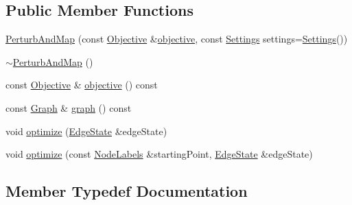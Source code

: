 \subsection*{Public Member Functions}
\begin{DoxyCompactItemize}
\item 
\hyperlink{classnifty_1_1graph_1_1PerturbAndMap_ac9393c6144f1a6a6dd9583fdc3532126}{Perturb\+And\+Map} (const \hyperlink{classnifty_1_1graph_1_1PerturbAndMap_a472da1848b099c685994a2cc915b02ed}{Objective} \&\hyperlink{classnifty_1_1graph_1_1PerturbAndMap_aef91817fc21b3551316dc9ec9409e60a}{objective}, const \hyperlink{structnifty_1_1graph_1_1PerturbAndMap_1_1Settings}{Settings} settings=\hyperlink{structnifty_1_1graph_1_1PerturbAndMap_1_1Settings}{Settings}())
\item 
\hyperlink{classnifty_1_1graph_1_1PerturbAndMap_a416531d126ea6326e458e66ea1b8a6f5}{$\sim$\+Perturb\+And\+Map} ()
\item 
const \hyperlink{classnifty_1_1graph_1_1PerturbAndMap_a472da1848b099c685994a2cc915b02ed}{Objective} \& \hyperlink{classnifty_1_1graph_1_1PerturbAndMap_aef91817fc21b3551316dc9ec9409e60a}{objective} () const 
\item 
const \hyperlink{classnifty_1_1graph_1_1PerturbAndMap_a8c74ad131238a83d5abfdf99e726f00f}{Graph} \& \hyperlink{classnifty_1_1graph_1_1PerturbAndMap_af52c269eff379da1f0db9a261da49697}{graph} () const 
\item 
void \hyperlink{classnifty_1_1graph_1_1PerturbAndMap_a672b5d3d205bdc8302e60666045724b6}{optimize} (\hyperlink{classnifty_1_1graph_1_1PerturbAndMap_aecae76ea82e2ee66c5f8186132c88a5c}{Edge\+State} \&edge\+State)
\item 
void \hyperlink{classnifty_1_1graph_1_1PerturbAndMap_a01ca40ef051122b9c282a3065867846b}{optimize} (const \hyperlink{classnifty_1_1graph_1_1PerturbAndMap_aaf657e3c33a321710e6db17adb3df3ff}{Node\+Labels} \&starting\+Point, \hyperlink{classnifty_1_1graph_1_1PerturbAndMap_aecae76ea82e2ee66c5f8186132c88a5c}{Edge\+State} \&edge\+State)
\end{DoxyCompactItemize}


\subsection{Member Typedef Documentation}
\hypertarget{classnifty_1_1graph_1_1PerturbAndMap_aecae76ea82e2ee66c5f8186132c88a5c}{}
